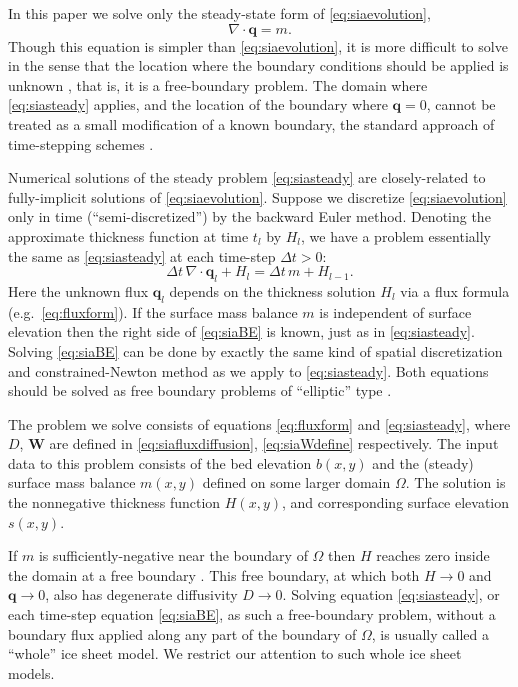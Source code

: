 \documentclass[twocolumn,letterpaper]{igs}
\newcommand\bq{\mathbf{q}}
\newcommand\bW{\mathbf{W}}
\newcommand{\Div}{\nabla\cdot}
\begin{document}
In this paper we solve only the steady-state form of \eqref{eq:siaevolution},
\begin{equation}
\Div \bq = m.  \label{eq:siasteady}
\end{equation}
Though this equation is simpler than \eqref{eq:siaevolution}, it is more difficult to solve in the sense that the location where the boundary conditions should be applied is unknown \citep{JaroschSchoofAnslow2013,JouvetBueler2012}, that is, it is a free-boundary problem.  The domain where \eqref{eq:siasteady} applies, and the location of the boundary where $\bq=0$, cannot be treated as a small modification of a known boundary, the standard approach of time-stepping schemes \citep{Bueleretal2005,Huybrechtsetal1996}.

Numerical solutions of the steady problem \eqref{eq:siasteady} are closely-related to fully-implicit  solutions of \eqref{eq:siaevolution}.  Suppose we discretize \eqref{eq:siaevolution} only in time (``semi-discretized'') by the backward Euler method.  Denoting the approximate thickness function at time $t_l$ by $H_l$, we have a problem essentially the same as \eqref{eq:siasteady} at each time-step $\Delta t> 0$:
\begin{equation}
\Delta t\,\Div \bq_l + H_l = \Delta t\,m + H_{l-1}.  \label{eq:siaBE}
\end{equation}
Here the unknown flux $\bq_l$ depends on the thickness solution $H_l$ via a flux formula (e.g.~\eqref{eq:fluxform}).  If the surface mass balance $m$ is independent of surface elevation then the right side of \eqref{eq:siaBE} is known, just as in \eqref{eq:siasteady}.  Solving \eqref{eq:siaBE} can be done by exactly the same kind of spatial discretization and constrained-Newton method as we apply to \eqref{eq:siasteady}.  Both equations should be solved as free boundary problems of ``elliptic'' type \citep{JouvetBueler2012}.

The problem we solve consists of equations \eqref{eq:fluxform} and \eqref{eq:siasteady}, where $D$, $\bW$ are defined in \eqref{eq:siafluxdiffusion}, \eqref{eq:siaWdefine} respectively.  The input data to this problem consists of the bed elevation $b(x,y)$ and the (steady) surface mass balance $m(x,y)$ defined on some larger domain $\Omega$.  The solution is the nonnegative thickness function $H(x,y)$, and corresponding surface elevation $s(x,y)$.

If $m$ is sufficiently-negative near the boundary of $\Omega$ then $H$ reaches zero inside the domain at a free boundary \citep{JouvetBueler2012}.  This free boundary, at which both $H\to 0$ and $\bq \to 0$, also has degenerate diffusivity $D \to 0$.  Solving equation \eqref{eq:siasteady}, or each time-step equation \eqref{eq:siaBE}, as such a free-boundary problem, without a boundary flux applied along any part of the boundary of $\Omega$, is usually called a ``whole'' ice sheet model.  We restrict our attention to such whole ice sheet models.
\end{document}
